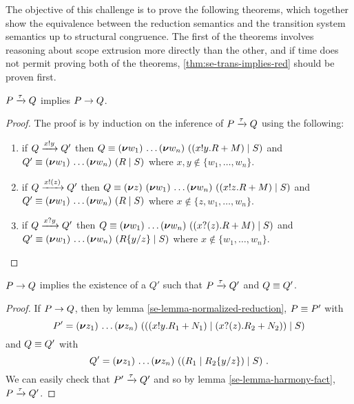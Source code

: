 The objective of this challenge is to prove the following theorems, which together show the equivalence between the reduction semantics and the transition system semantics up to structural congruence.
The first of the theorems involves reasoning about scope extrusion more directly than the other, and if time does not permit proving both of the theorems, \autoref{thm:se-trans-implies-red} should be proven first.
\begin{theorem}\label{thm:se-trans-implies-red}
  \( P \xrightarrow{\tau} Q \) implies \( P \rightarrow Q \).
\end{theorem}
\begin{proof}
  The proof is by induction on the inference of \( P \xrightarrow{\tau} Q \) using the following:
  \begin{enumerate}
  \item if \( Q \xrightarrow{x ! y} Q' \) then \( Q \equiv (\bm{\nu} w_1)~\!\dots (\bm{\nu} w_n)~((x ! y . R + M) \mid S) \) and \( Q' \equiv (\bm{\nu} w_1)~\!\dots (\bm{\nu} w_n)~(R \mid S) \) where \( x,y \notin \{ w_1, \dots, w_n \} \).
  \item if \( Q \xrightarrow{x ! (z)} Q' \) then \( Q \equiv (\bm{\nu} z)~(\bm{\nu} w_1)~\!\dots (\bm{\nu} w_n)~((x ! z . R + M) \mid S) \) and \( Q' \equiv (\bm{\nu} w_1)~\!\dots (\bm{\nu} w_n)~(R \mid S) \) where \( x \notin \{ z, w_1, \dots, w_n \} \).
  \item if \( Q \xrightarrow{x ? y} Q' \) then \( Q \equiv (\bm{\nu} w_1)~\!\dots (\bm{\nu} w_n)~((x ? (z) . R + M) \mid S) \) and \( Q' \equiv (\bm{\nu} w_1)~\!\dots (\bm{\nu} w_n)~(R\{y/z\} \mid S) \) where \( x \notin \{ w_1, \dots, w_n \} \).
  \end{enumerate}
\end{proof}

\begin{theorem}
  \( P \rightarrow Q \) implies the existence of a \( Q' \) such that \( P \xrightarrow{\tau} Q' \) and \( Q \equiv Q' \).
\end{theorem}
\begin{proof}
  If \( P \rightarrow Q \), then by lemma \autoref{se-lemma-normalized-reduction}, \( P \equiv P' \) with
  \begin{equation*}
    P' = (\bm{\nu} z_1)~\!\dots (\bm{\nu} z_n)~(((x ! y . R_1 + N_1) \mid (x ? (z) . R_2 + N_2)) \mid S)
  \end{equation*}
  and \( Q \equiv Q' \) with
  \begin{equation*}
    Q' = (\bm{\nu} z_1)~\!\dots (\bm{\nu} z_n)~((R_1 \mid R_2\{y/z\}) \mid S) \ .
  \end{equation*}
  We can easily check that \( P' \xrightarrow{\tau} Q' \) and so by lemma \autoref{se-lemma-harmony-fact}, \( P \xrightarrow{\tau} Q' \).
\end{proof}

